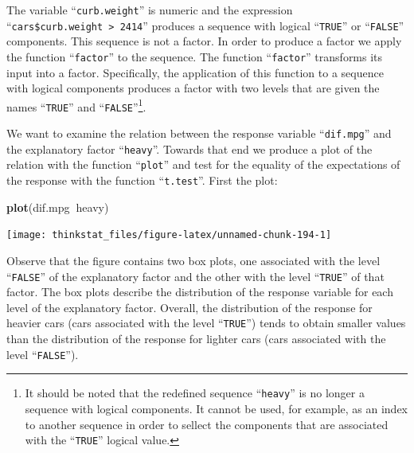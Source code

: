 \documentclass[]{krantz}
\makeatletter
\newenvironment{Shaded}{\begin{snugshade}}{\end{snugshade}}
\newcommand{\KeywordTok}[1]{\textcolor[rgb]{0.13,0.29,0.53}{\textbf{#1}}}
\newcommand{\DecValTok}[1]{\textcolor[rgb]{0.00,0.00,0.81}{#1}}
\newcommand{\StringTok}[1]{\textcolor[rgb]{0.31,0.60,0.02}{#1}}
\newcommand{\OperatorTok}[1]{\textcolor[rgb]{0.81,0.36,0.00}{\textbf{#1}}}
\newcommand{\NormalTok}[1]{#1}
\newenvironment{kframe}{%
\medskip{}
\setlength{\fboxsep}{.8em}
 \def\at@end@of@kframe{}%
 \ifinner\ifhmode%
  \def\at@end@of@kframe{\end{minipage}}%
  \begin{minipage}{\columnwidth}%
 \fi\fi%
 \def\FrameCommand##1{\hskip\@totalleftmargin \hskip-\fboxsep
 \colorbox{shadecolor}{##1}\hskip-\fboxsep
     \hskip-\linewidth \hskip-\@totalleftmargin \hskip\columnwidth}%
 \MakeFramed {\advance\hsize-\width
   \@totalleftmargin\z@ \linewidth\hsize
   \@setminipage}}%
 {\par\unskip\endMakeFramed%
 \at@end@of@kframe}
\renewenvironment{Shaded}{\begin{kframe}}{\end{kframe}}
\theoremstyle{definition}
\theoremstyle{definition}
\theoremstyle{definition}
\theoremstyle{remark}
\makeatother
\begin{document}
\begin{Shaded}
\end{Shaded}

The variable ``\texttt{curb.weight}'' is numeric and the expression
``\texttt{cars\$curb.weight\ \textgreater{}\ 2414}'' produces a sequence
with logical ``\texttt{TRUE}'' or ``\texttt{FALSE}'' components. This
sequence is not a factor. In order to produce a factor we apply the
function ``\texttt{factor}'' to the sequence. The function
``\texttt{factor}'' transforms its input into a factor. Specifically,
the application of this function to a sequence with logical components
produces a factor with two levels that are given the names
``\texttt{TRUE}'' and ``\texttt{FALSE}''\footnote{It should be noted
  that the redefined sequence ``\texttt{heavy}'' is no longer a sequence
  with logical components. It cannot be used, for example, as an index
  to another sequence in order to sellect the components that are
  associated with the ``\texttt{TRUE}'' logical value.}.

We want to examine the relation between the response variable
``\texttt{dif.mpg}'' and the explanatory factor ``\texttt{heavy}''.
Towards that end we produce a plot of the relation with the function
``\texttt{plot}'' and test for the equality of the expectations of the
response with the function ``\texttt{t.test}''. First the plot:

\begin{Shaded}
\begin{Highlighting}[]
\KeywordTok{plot}\NormalTok{(dif.mpg}\OperatorTok{~}\NormalTok{heavy)}
\end{Highlighting}
\end{Shaded}

\begin{center}\texttt{[image: thinkstat\_files/figure-latex/unnamed-chunk-194-1]} \end{center}

Observe that the figure contains two box plots, one associated with the
level ``\texttt{FALSE}'' of the explanatory factor and the other with
the level ``\texttt{TRUE}'' of that factor. The box plots describe the
distribution of the response variable for each level of the explanatory
factor. Overall, the distribution of the response for heavier cars (cars
associated with the level ``\texttt{TRUE}'') tends to obtain smaller
values than the distribution of the response for lighter cars (cars
associated with the level ``\texttt{FALSE}'').
\end{document}
